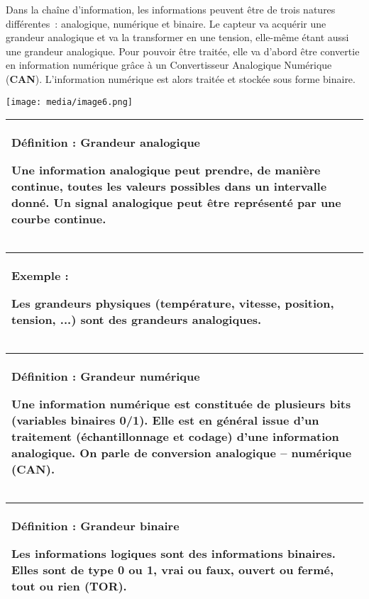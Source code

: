 \documentclass[
]{article}
\begin{document}
Dans la chaîne d'information, les informations peuvent être de trois
natures différentes~: analogique, numérique et binaire. Le capteur va
acquérir une grandeur analogique et va la transformer en une tension,
elle-même étant aussi une grandeur analogique. Pour pouvoir être
traitée, elle va d'abord être convertie en information numérique grâce à
un Convertisseur Analogique Numérique (\textbf{CAN}). L'information
numérique est alors traitée et stockée sous forme binaire.

\texttt{[image: media/image6.png]}

\begin{longtable}[]{@{}
  >{\raggedright\arraybackslash}p{}@{}}
\toprule
\endhead
\textbf{Définition : Grandeur analogique}

Une information analogique peut prendre, de manière continue, toutes les
valeurs possibles dans un intervalle donné. Un signal analogique peut
être représenté par une courbe continue. \\
\bottomrule
\end{longtable}

\begin{longtable}[]{@{}
  >{\raggedright\arraybackslash}p{}@{}}
\toprule
\endhead
\textbf{Exemple :}

Les grandeurs physiques (température, vitesse, position, tension, ...)
sont des grandeurs analogiques. \\
\bottomrule
\end{longtable}

\begin{longtable}[]{@{}
  >{\raggedright\arraybackslash}p{}@{}}
\toprule
\endhead
\textbf{Définition : Grandeur numérique}

Une information numérique est constituée de plusieurs bits (variables
binaires 0/1). Elle est en général issue d'un traitement
(échantillonnage et codage) d'une information analogique. On parle de
conversion analogique -- numérique (CAN). \\
\bottomrule
\end{longtable}

\begin{longtable}[]{@{}
  >{\raggedright\arraybackslash}p{}@{}}
\toprule
\endhead
\textbf{Définition : Grandeur binaire}

Les informations logiques sont des informations binaires. Elles sont de
type 0 ou 1, vrai ou faux, ouvert ou fermé, tout ou rien (TOR). \\
\bottomrule
\end{longtable}
\end{document}
